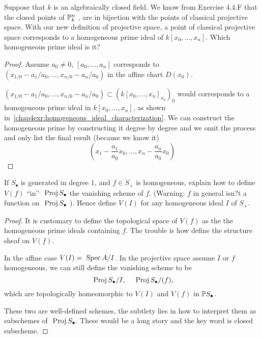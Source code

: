 \begin{exr}
Suppose that $k$ is an algebraically closed field. We know from Exercise 4.4.F that the closed points of $\mathbb P^n_k$ , are in bijection with the points of classical projective space. With our new definition of projective space, a point of classical projective space corresponds to a homogeneous prime ideal of $k[x_0,...,x_n]$. Which homogeneous prime ideal is it?
\end{exr}
\begin{proof} Assume $a_0\neq 0$,
$[a_0,...,a_n]$ corresponds to $(x_{1/0}-a_1/a_0,...,x_{n/0}-a_n/a_0)$ in the affine chart $D(x_0)$.

$(x_{1/0}-a_1/a_0,...,x_{n/0}-a_n/a_0)\subset (k[x_0,...,x_n]_{x_0})_0$ would corresponds to a homogeneous prime ideal in $k[x_0,...,x_n]$, as shown in~\ref{chap4exr:homogeneous_ideal_characterization}. We can construct the homogeneous prime by constructing it degree by degree and we omit the process and only list the final result (because we know it)
$$
\left(x_1-\frac{a_1}{a_0}x_0,...,x_n-\frac{a_n}{a_0}x_0\right)
$$
\end{proof}

\begin{exr}
If $S_\bullet$ is generated in degree $1$, and $f \in S_+$ is homogeneous, explain how to define $V(f)$ ``in'' $\text{ Proj\,} S_\bullet$ the vanishing scheme of $f$. 
(Warning: $f$ in general isn?t a function on $\text{ Proj\,} S_\bullet$ ). Hence define $V(I)$ for any homogeneous ideal $I$ of $S_+$.
\end{exr}
\begin{proof}
It is customary to define the topological space of $V(f)$ as the the homogeneous prime ideals containing $f$. The trouble is how define the structure sheaf on $V(f)$. 

In the affine case $V(I)=\text{ Spec\,} A/I$. In the projective space assume $I$ or $f$ homogeneous, we can still define the vanishing scheme to be
$$
\text{ Proj\,} S_\bullet/I,\ \ \ \text{ Proj\,} S_\bullet/(f),
$$
which are topologically homeomorphic to $V(I)$ and $V(f)$ in $\mathbb P S_\bullet$.


These two are well-defined schemes,
the subtlety lies in how to interpret them as subschemes of $\text{ Proj\,} S_\bullet$. These would be a long story and the key word is closed subscheme.
\end{proof}

